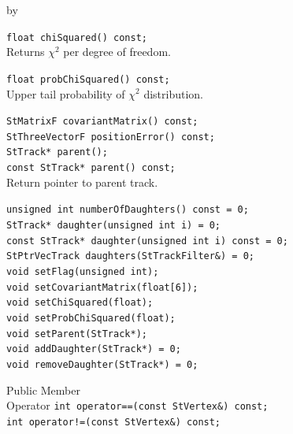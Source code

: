 \documentclass[twoside]{article}
\newcommand{\entrylabel}[1]{\mbox{\textbf{{#1}}}\hfil}%
\newenvironment{entry}
{\begin{list}{}%
    {\renewcommand{\makelabel}{\entrylabel}%
     \setlength{\labelwidth}{90pt}%
     \setlength{\leftmargin}{\labelwidth}
     \advance\leftmargin by \labelsep%
      }%
    }%
  {\end{list}}
\newcommand{\Entrylabel}[1]%
{\raisebox{0pt}[1ex][0pt]{\makebox[\labelwidth][l]%
    {\parbox[t]{\labelwidth}{\hspace{0pt}\textbf{{#1}}}}}}
\newenvironment{Entry}%
{\renewcommand{\entrylabel}{\Entrylabel}\begin{entry}}%
  {\end{entry}}
\begin{document}
\begin{Entry}
    \verb+float chiSquared() const;+\\
    Returns $\chi^2$ per degree of freedom. 

    \verb+float probChiSquared() const;+\\
    Upper tail probability of $\chi^2$ distribution.

    \verb+StMatrixF covariantMatrix() const;+\\

    \verb+StThreeVectorF positionError() const;+\\
    
    \verb+StTrack* parent();+\\
    \verb+const StTrack* parent() const;+\\
    Return pointer to parent track.
    
    \verb+unsigned int numberOfDaughters() const = 0;+\\

    \verb+StTrack* daughter(unsigned int i) = 0;+\\
    \verb+const StTrack* daughter(unsigned int i) const = 0;+\\

    \verb+StPtrVecTrack daughters(StTrackFilter&) = 0;+\\

    \verb+void setFlag(unsigned int);+\\
    \verb+void setCovariantMatrix(float[6]);+\\
    \verb+void setChiSquared(float);+\\
    \verb+void setProbChiSquared(float);+\\
    \verb+void setParent(StTrack*);+\\
    \verb+void addDaughter(StTrack*) = 0;+\\
    \verb+void removeDaughter(StTrack*) = 0;+\\

\item[Public Member\\ Operator]
    \verb+int operator==(const StVertex&) const;+\\
    \verb+int operator!=(const StVertex&) const;+\\
\end{Entry}
\clearpage
\end{document}
